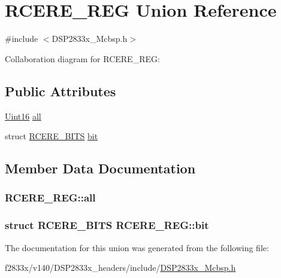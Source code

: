 \hypertarget{union_r_c_e_r_e___r_e_g}{}\section{R\+C\+E\+R\+E\+\_\+\+R\+E\+G Union Reference}
\label{union_r_c_e_r_e___r_e_g}


{\ttfamily \#include $<$D\+S\+P2833x\+\_\+\+Mcbsp.\+h$>$}



Collaboration diagram for R\+C\+E\+R\+E\+\_\+\+R\+E\+G\+:
\subsection*{Public Attributes}
\begin{DoxyCompactItemize}
\item 
\hyperlink{_d_s_p2833x___device_8h_a59a9f6be4562c327cbfb4f7e8e18f08b}{Uint16} \hyperlink{union_r_c_e_r_e___r_e_g_a8df0a4f8bc3b5192068c9b6413caa41c}{all}
\item 
struct \hyperlink{struct_r_c_e_r_e___b_i_t_s}{R\+C\+E\+R\+E\+\_\+\+B\+I\+T\+S} \hyperlink{union_r_c_e_r_e___r_e_g_a5258fd4c545d5f1b99a1ba2d5e23da58}{bit}
\end{DoxyCompactItemize}


\subsection{Member Data Documentation}
\hypertarget{union_r_c_e_r_e___r_e_g_a8df0a4f8bc3b5192068c9b6413caa41c}{}
\subsubsection[{all}]{ R\+C\+E\+R\+E\+\_\+\+R\+E\+G\+::all}\label{union_r_c_e_r_e___r_e_g_a8df0a4f8bc3b5192068c9b6413caa41c}
\hypertarget{union_r_c_e_r_e___r_e_g_a5258fd4c545d5f1b99a1ba2d5e23da58}{}
\subsubsection[{bit}]{\setlength{\rightskip}{0pt plus 5cm}struct {\bf R\+C\+E\+R\+E\+\_\+\+B\+I\+T\+S} R\+C\+E\+R\+E\+\_\+\+R\+E\+G\+::bit}\label{union_r_c_e_r_e___r_e_g_a5258fd4c545d5f1b99a1ba2d5e23da58}


The documentation for this union was generated from the following file\+:\begin{DoxyCompactItemize}
\item 
f2833x/v140/\+D\+S\+P2833x\+\_\+headers/include/\hyperlink{_d_s_p2833x___mcbsp_8h}{D\+S\+P2833x\+\_\+\+Mcbsp.\+h}\end{DoxyCompactItemize}
